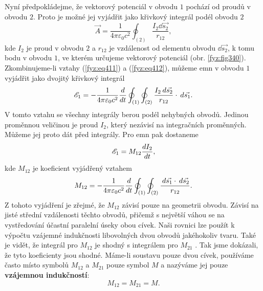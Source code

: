 {  Nyní předpokládejme, že vektorový potenciál v obvodu \(1\) pochází od proudů v obvodu \(2\). 
  Proto je možné jej vyjádřit jako křivkový integrál podél obvodu \(2\)
  \begin{equation}\label{fyz:eq412}
    \vec{A} = \frac{1}{4\pi\varepsilon_0c^2}\oint_{(2)}\frac{I_2\dd{\vec{s_2}}}{r_{12}},
  \end{equation}
  kde \(I_2\) je proud v obvodu \(2\) a \(r_{12}\) je vzdálenost od elementu obvodu 
  \(\dd\vec{s_2}\), k tomu bodu v obvodu \(1\), ve kterém určujeme vektorový potenciál (obr. 
  \ref{fyz:fig340}). Zkombinujeme-li vztahy (\ref{fyz:eq411}) a (\ref{fyz:eq412}), můžeme emn v 
  obvodu \(1\) vyjádřit jako dvojitý křivkový integrál
  \begin{equation}\label{fyz:eq413}
    \mathscr{E}_1 = - \frac{1}{4\pi\varepsilon_0c^2}\dfrac{d  }{d t}
                    \oint_{(1)}\oint_{(2)}\frac{I_2\hspace{2pt}d\vec{s_2}}{r_{12}}\cdot\hspace{2pt}d\vec{s_1}.
  \end{equation}
  V tomto vztahu se všechny integrály berou podél nehybných obvodů. Jedinou proměnnou veličinou je 
  proud \(I_2\), který nezávisí na integračních proměnných. Můžeme jej proto dát před
  integrály. Pro emn pak dostaneme 
  \begin{equation*}
    \mathscr{E}_1 = M_{12}\dfrac{d I_2}{d t},
  \end{equation*}
  kde \(M_{12}\) je koeficient vyjádřený vztahem
  \begin{equation}\label{fyz:eq414}
    M_{12} = - \frac{1}{4\pi\varepsilon_0c^2}\dfrac{d  }{d t}
             \oint_{(1)}\oint_{(2)}\frac{\hspace{2pt}d\vec{s_1}\cdot\hspace{2pt}d\vec{s_2}}{r_{12}}.
  \end{equation}
  Z tohoto vyjádření je zřejmé, že \(M_{12}\)  závisí pouze na geometrii obvodu. Závisí na jisté 
  střední vzdálenosti těchto obvodů, přičemž s největší váhou se na vystředování účastní paralelní 
  úseky obou cívek. Naši rovnici lze použít k výpočtu vzájemné indukčnosti libovolných dvou obvodů
  jakéhokoliv tvaru. Také je vidět, že integrál pro \(M_{12}\)  je shodný s integrálem pro 
  \(M_{21}\) . Tak jsme dokázali, že tyto koeficienty jsou shodné. Máme-li soustavu pouze dvou 
  cívek, používáme často místo symbolů \(M_{12}\) a \(M_{21}\)  pouze symbol \(M\) a nazýváme jej 
  pouze \textbf{vzájemnou indukčností}:
  \begin{equation*}
    M_{12} =  M_{21} = M.
  \end{equation*}
  
}
